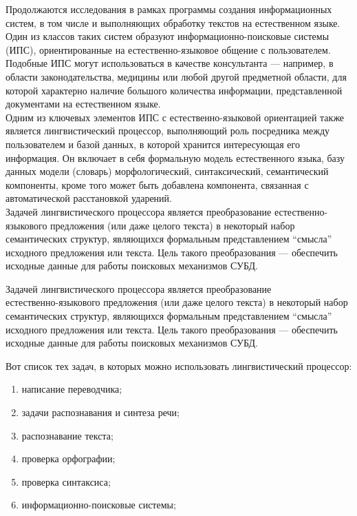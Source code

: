 Продолжаются исследования в рамках программы создания информационных систем, в том числе и выполняющих обработку текстов на естественном языке. Один из классов таких систем образуют информационно-поисковые системы (ИПС), ориентированные на естественно-языковое общение с пользователем. Подобные ИПС могут использоваться в качестве консультанта — например, в области законодательства, медицины или любой другой предметной области, для которой характерно наличие большого количества информации, представленной документами на естественном языке. \\
Одним из ключевых элементов ИПС с естественно-языковой ориентацией также является лингвистический процессор, выполняющий роль посредника между пользователем и базой данных, в которой хранится интересующая его информация. Он включает в себя формальную модель естественного языка, базу данных модели (словарь) морфологический, синтаксический, семантический компоненты, кроме того может быть добавлена компонента, связанная с автоматической расстановкой ударений. \\
Задачей лингвистического процессора является преобразование естественно-языкового предложения (или даже целого текста) в некоторый набор семантических структур, являющихся формальным представлением “смысла” исходного предложения или текста. Цель такого преобразования — обеспечить исходные данные для работы поисковых механизмов СУБД. 

Задачей лингвистического процессора является преобразование \\
естественно-языкового предложения (или даже целого текста) в некоторый набор семантических структур, являющихся формальным представлением “смысла” исходного предложения или текста. Цель такого преобразования — обеспечить исходные данные для работы поисковых механизмов СУБД.

\newpage

Вот список тех задач, в которых можно использовать лингвистический процессор: 
\begin{enumerate} 
    \item написание переводчика;
    \item задачи распознавания и синтеза речи;
    \item распознавание текста;
    \item проверка орфографии;
    \item проверка синтаксиса;
    \item информационно-поисковые системы;
\end{enumerate}

